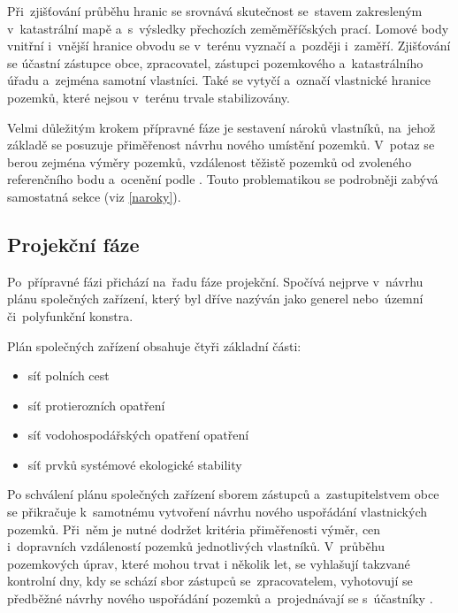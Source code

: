 Při~zjišťování průběhu hranic se srovnává skutečnost se~stavem zakresleným v~katastrální mapě a~s~výsledky přechozích zeměměříčských prací. Lomové body vnitřní i~vnější hranice obvodu se v~terénu vyznačí a~později i~zaměří. Zjišťování se účastní zástupce obce, zpracovatel, zástupci pozemkového a~katastrálního úřadu a~zejména samotní vlastníci. Také se vytyčí a~označí vlastnické hranice pozemků, které nejsou v~terénu trvale stabilizovány.

Velmi důležitým krokem přípravné fáze je sestavení nároků vlastníků, na~jehož základě se posuzuje přiměřenost návrhu nového umístění pozemků. V~potaz se berou zejména výměry pozemků, vzdálenost těžistě pozemků od zvoleného referenčního bodu a~ocenění podle . Touto problematikou se podrobněji zabývá samostatná sekce (viz \ref{naroky}).

\subsection{Projekční fáze}
\label{projekcni_faze}

Po~přípravné fázi přichází na~řadu fáze projekční. Spočívá nejprve v~návrhu plánu společných zařízení, který byl dříve nazýván jako generel nebo~územní či~polyfunkční konstra.

Plán společných zařízení obsahuje čtyři základní části:
	\begin{itemize}[leftmargin=1.5cm, noitemsep]
		\item síť polních cest
		\item síť protierozních opatření
		\item síť vodohospodářských opatření opatření
		\item síť prvků systémové ekologické stability
	\end{itemize}

Po schválení plánu společných zařízení sborem zástupců a~zastupitelstvem obce se přikračuje k~samotnému vytvoření návrhu nového uspořádání vlastnických pozemků. Při~něm je nutné dodržet kritéria přiměřenosti výměr, cen i~dopravních vzdáleností pozemků jednotlivých vlastníků. V~průběhu pozemkových úprav, které mohou trvat i několik let, se vyhlašují takzvané kontrolní dny, kdy se schází sbor zástupců se~zpracovatelem, vyhotovují se předběžné návrhy nového uspořádání pozemků a~projednávají se s~účastníky .

